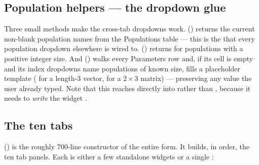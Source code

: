 \subsection{Population helpers --- the dropdown glue}

Three small methods make the cross-tab dropdowns work.
 () returns the current non-blank
population names from the Populations table --- this is the 
that every population dropdown elsewhere is wired to. 
() returns  for populations with
a positive integer size. And 
() walks every Parameters row and, if its
 cell is empty and its index dropdowns name populations of known
size, fills a placeholder template ( for a length-3 vector,
 for a $2\times3$ matrix) --- preserving any value the user
already typed. Note that this reaches directly into
 rather than , because it
needs to \emph{write} the widget .

\subsection{The ten tabs}

 () is the roughly
700-line constructor of the entire form. It builds, in order, the ten tab panels.
Each is either a few standalone widgets or a single :

